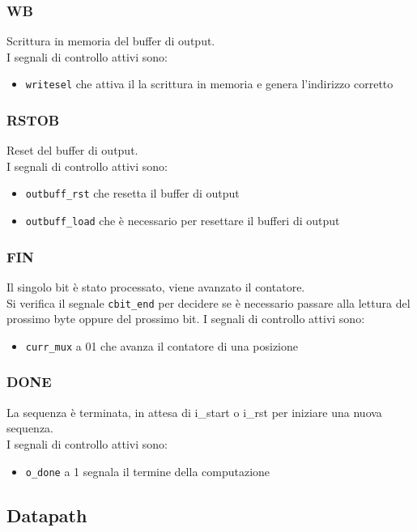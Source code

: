 \documentclass[12pt, a4paper]{article}
\begin{document}
\subsubsection{WB}
Scrittura in memoria del buffer di output.\\
I segnali di controllo attivi sono:
\begin{itemize}
    \item \texttt{writesel} che attiva il la scrittura in memoria e genera l'indirizzo corretto
\end{itemize}

\subsubsection{RSTOB}
Reset del buffer di output.\\
I segnali di controllo attivi sono:
\begin{itemize}
    \item \texttt{outbuff\_rst} che resetta il buffer di output
    \item \texttt{outbuff\_load} che è necessario per resettare il bufferi di output
\end{itemize}

\subsubsection{FIN}
Il singolo bit è stato processato, viene avanzato il contatore.\\
Si verifica il segnale \texttt{cbit\_end} per decidere se è necessario passare alla lettura del
prossimo byte oppure del prossimo bit.
I segnali di controllo attivi sono:
\begin{itemize}
    \item \texttt{curr\_mux} a 01 che avanza il contatore di una posizione
\end{itemize}

\subsubsection{DONE}
La sequenza è terminata, in attesa di i\_start o i\_rst per iniziare una nuova sequenza.\\
I segnali di controllo attivi sono:
\begin{itemize}
    \item \texttt{o\_done} a 1 segnala il termine della computazione
\end{itemize}

\subsection{Datapath}
\end{document}
